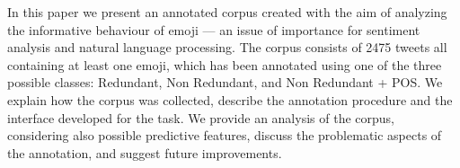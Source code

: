 In this paper we present an annotated corpus created with the aim of analyzing the informative behaviour of emoji --- an issue of importance for sentiment analysis and natural language processing. The corpus consists of 2475 tweets all containing at least one emoji, which has been annotated using one of the three possible classes: Redundant, Non Redundant, and Non Redundant + POS. We explain how the corpus was collected, describe the annotation procedure and the interface developed for the task. We provide an analysis of the corpus, considering also possible predictive features, discuss the problematic aspects of the annotation, and suggest future improvements.
